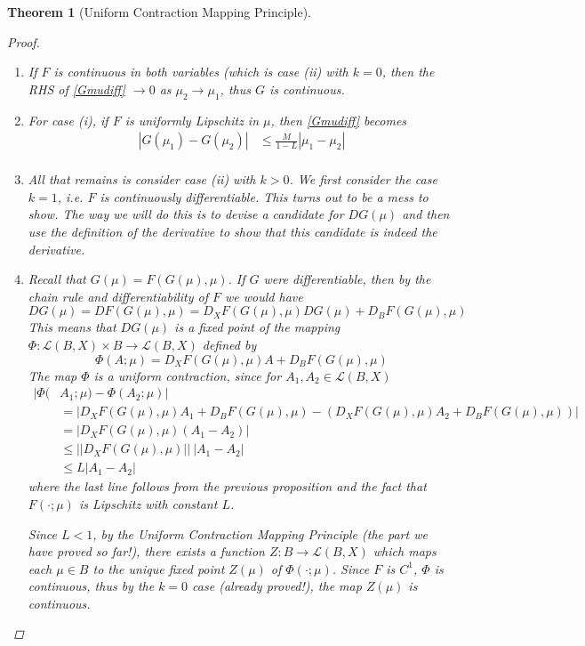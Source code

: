 \documentclass[12pt]{amsart}         %
\newtheorem{theorem}{Theorem}[section]
\theoremstyle{remark}
\begin{document}
\begin{theorem}[Uniform Contraction Mapping Principle]
\begin{proof}
\begin{enumerate}
\item If $F$ is continuous in both variables (which is case (ii) with $k = 0$, then the RHS of \eqref{Gmudiff} $\rightarrow 0$ as $\mu_2 \rightarrow \mu_1$, thus $G$ is continuous.

\item For case (i), if $F$ is uniformly Lipschitz in $\mu$, then \eqref{Gmudiff} becomes 
\begin{align*}
|G(\mu_1) - G(\mu_2)| &\leq \frac{M}{1-L} |\mu_1 - \mu_2| \\
\end{align*}

\item All that remains is consider case (ii) with $k > 0$. We first consider the case $k = 1$, i.e. $F$ is continuously differentiable. This turns out to be a mess to show. The way we will do this is to devise a candidate for $DG(\mu)$ and then use the definition of the derivative to show that this candidate is indeed the derivative.

\item Recall that $G(\mu) = F(G(\mu),\mu)$. If $G$ were differentiable, then by the chain rule and differentiability of $F$ we would have
\[
DG(\mu) = DF(G(\mu),\mu) = D_X F(G(\mu), \mu)DG(\mu) + D_B F(G(\mu), \mu)
\]
This means that $DG(\mu)$ is a fixed point of the mapping $\Phi: \mathcal{L}(B, X) \times B \rightarrow \mathcal{L}(B, X)$ defined by
\[
\Phi(A; \mu) = D_X F(G(\mu), \mu) A + D_B F(G(\mu), \mu)
\]
The map $\Phi$ is a uniform contraction, since for $A_1, A_2 \in \mathcal{L}(B, X)$
\begin{align*}
|\Phi(&A_1; \mu) - \Phi(A_2; \mu)| \\
&= | D_X F(G(\mu), \mu) A_1 + D_B F(G(\mu), \mu) - (D_X F(G(\mu), \mu) A_2 + D_B F(G(\mu), \mu)) | \\
&= | D_X F(G(\mu), \mu) (A_1 - A_2) | \\
&\leq ||D_X F(G(\mu), \mu) ||\:|A_1 - A_2| \\
&\leq L |A_1 - A_2|
\end{align*}
where the last line follows from the previous proposition and the fact that $F(\cdot; \mu)$ is Lipschitz with constant $L$.

Since $L < 1$, by the Uniform Contraction Mapping Principle (the part we have proved so far!), there exists a function $Z: B \rightarrow \mathcal{L}(B, X)$ which maps each $\mu \in B$ to the unique fixed point $Z(\mu)$ of $\Phi(\cdot; \mu)$. Since $F$ is $C^1$, $\Phi$ is continuous, thus by the $k = 0$ case (already proved!), the map $Z(\mu)$ is continuous.
    

\end{enumerate}
\end{proof}
\end{theorem}
\end{document}
